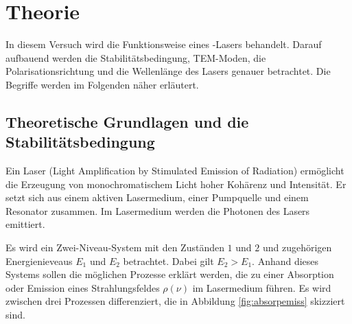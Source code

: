 \section{Theorie}
\label{sec:Theorie}
In diesem Versuch wird die Funktionsweise eines -Lasers behandelt. Darauf aufbauend werden
die Stabilitätsbedingung, TEM-Moden, die Polarisationsrichtung und die Wellenlänge des Lasers
genauer betrachtet. Die Begriffe werden im Folgenden näher erläutert.

\subsection{Theoretische Grundlagen und die Stabilitätsbedingung}
Ein Laser (Light Amplification by Stimulated Emission of Radiation) ermöglicht die Erzeugung
von monochromatischem Licht hoher Kohärenz und Intensität. Er setzt sich aus einem aktiven 
Lasermedium, einer Pumpquelle und einem Resonator zusammen. Im Lasermedium werden die Photonen
des Lasers emittiert. 

Es wird ein Zwei-Niveau-System mit den Zuständen ${1}$ und ${2}$ und zugehörigen
Energienieveaus $E_{1}$ und $E_{2}$ betrachtet. Dabei gilt $E_{2}> E_{1}$. Anhand
dieses Systems sollen die möglichen Prozesse erklärt werden, die zu einer Absorption oder 
Emission eines Strahlungsfeldes  $\rho(\nu)$ im Lasermedium führen. Es wird zwischen
drei Prozessen differenziert, die in Abbildung \ref{fig:absorpemiss} skizziert sind.

